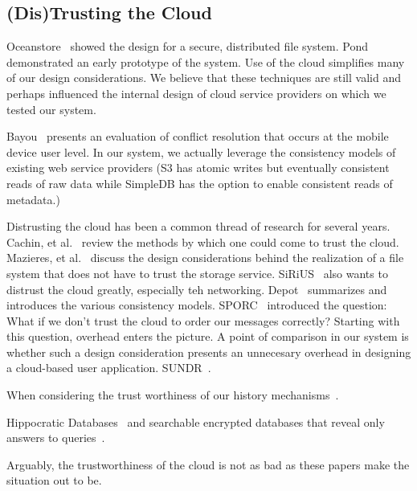 \subsection{(Dis)Trusting the Cloud}
Oceanstore~\cite{oceanstore} showed the design for a secure,
distributed file system. Pond~\cite{pond} demonstrated an early
prototype of the system. Use of the cloud simplifies many of our
design considerations. We believe that these techniques are still
valid and perhaps influenced the internal design of cloud service
providers on which we tested our system.

Bayou~\cite{bayou} presents an evaluation of conflict resolution that
occurs at the mobile device user level. In our system, we actually
leverage the consistency models of existing web service providers (S3
has atomic writes but eventually consistent reads of raw data while
SimpleDB has the option to enable consistent reads of metadata.)

Distrusting the cloud has been a common thread of research for several
years. Cachin, et al.~\cite{trusting} review the methods by which one
could come to trust the cloud. Mazieres, et al.~\cite{sfsbyzantine,
  donttrust} discuss the design considerations behind the realization
of a file system that does not have to trust the storage
service. SiRiUS~\cite{sirius} also wants to distrust the cloud
greatly, especially teh networking. Depot~\cite{depot} summarizes and
introduces the various consistency models. SPORC~\cite{sporc}
introduced the question: What if we don't trust the cloud to order our
messages correctly? Starting with this question, overhead enters the
picture. A point of comparison in our system is whether such a design
consideration presents an unnecesary overhead in designing a
cloud-based user application. SUNDR~\cite{sundr}.

When considering the trust worthiness of our history
mechanisms~\cite{fakepicasso}.

 Hippocratic
Databases~\cite{hippocratic} and searchable encrypted databases that
reveal only answers to queries~\cite{dawn}.

Arguably, the trustworthiness of the cloud is not as bad as these
papers make the situation out to be.

